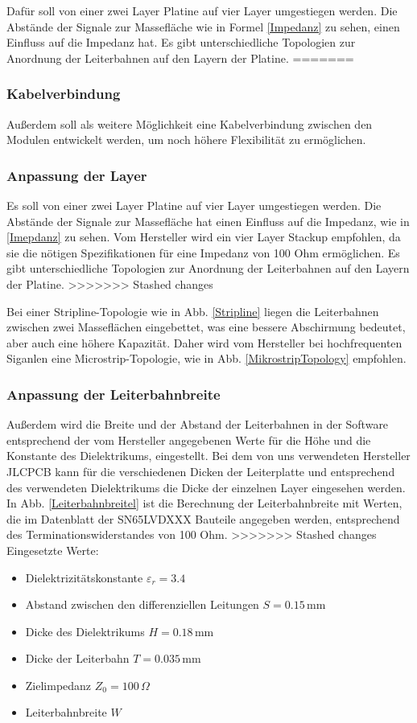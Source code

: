 Dafür soll von einer zwei Layer Platine auf vier Layer umgestiegen werden. Die Abstände der Signale zur Massefläche wie in Formel \ref{Impedanz} zu sehen, einen Einfluss auf die Impedanz hat. Es gibt unterschiedliche Topologien zur Anordnung der Leiterbahnen auf den Layern der Platine.
=======
\subsubsection{Kabelverbindung}
Außerdem soll als weitere Möglichkeit eine Kabelverbindung zwischen den Modulen entwickelt werden, um noch höhere Flexibilität zu ermöglichen.

\subsubsection{Anpassung der Layer}
Es soll von einer zwei Layer Platine auf vier Layer umgestiegen werden. Die Abstände der Signale zur Massefläche hat einen Einfluss auf die Impedanz, wie in \ref{Imepdanz} zu sehen. Vom Hersteller wird ein vier Layer Stackup empfohlen, da sie die nötigen Spezifikationen für eine Impedanz von 100 Ohm ermöglichen. Es gibt unterschiedliche Topologien zur Anordnung der Leiterbahnen auf den Layern der Platine.
>>>>>>> Stashed changes

 
Bei einer Stripline-Topologie wie in Abb. \ref{Stripline} liegen die Leiterbahnen zwischen zwei Masseflächen eingebettet, was eine bessere Abschirmung bedeutet, aber auch eine höhere Kapazität. Daher wird vom Hersteller bei hochfrequenten Siganlen eine Microstrip-Topologie, wie in Abb. \ref{MikrostripTopology} empfohlen. 



\subsubsection{Anpassung der Leiterbahnbreite}
Außerdem wird die Breite und der Abstand der Leiterbahnen in der Software entsprechend der vom Hersteller angegebenen Werte für die Höhe und die Konstante des Dielektrikums, eingestellt. Bei dem von uns verwendeten Hersteller JLCPCB kann für die verschiedenen Dicken der Leiterplatte und entsprechend des verwendeten Dielektrikums die Dicke der einzelnen Layer eingesehen werden.
In Abb. \ref{Leiterbahnbreitel} ist die Berechnung der Leiterbahnbreite mit Werten, die im Datenblatt der SN65LVDXXX Bauteile angegeben werden, entsprechend des Terminationswiderstandes von 100 Ohm.
>>>>>>> Stashed changes
\newline
Eingesetzte Werte:
\begin{itemize}
	\item Dielektrizitätskonstante \( \varepsilon_r = 3.4 \)
	\item Abstand zwischen den differenziellen Leitungen \( S = 0.15 \, \text{mm} \)
	\item Dicke des Dielektrikums \( H = 0.18 \, \text{mm} \)
	\item Dicke der Leiterbahn \( T = 0.035 \, \text{mm} \)
	\item Zielimpedanz \( Z_0 = 100 \, \Omega \)
	\item Leiterbahnbreite \( W \) 
\end{itemize}



